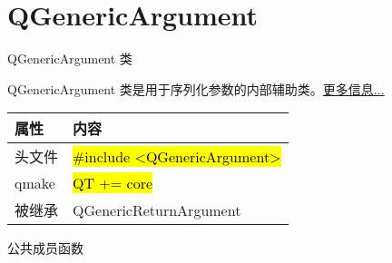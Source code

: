 \chapter{QGenericArgument }

QGenericArgument 类

QGenericArgument 类是用于序列化参数的内部辅助类。\href{https://github.com/JackLovel/QtDocumentCN/blob/master/Src/G/QGenericArgument/QGenericArgument.md#%E8%AF%A6%E7%BB%86%E6%8F%8F%E8%BF%B0}{更多信息...}

\begin{tabular}{|l|l|}
\hline
属性& 	内容\\
\hline
头文件& 	\hl{\#include <QGenericArgument>}\\
\hline
qmake& 	\hl{QT += core}\\
\hline
被继承& 	QGenericReturnArgument\\
\hline
\end{tabular}


\splitLine

公共成员函数

